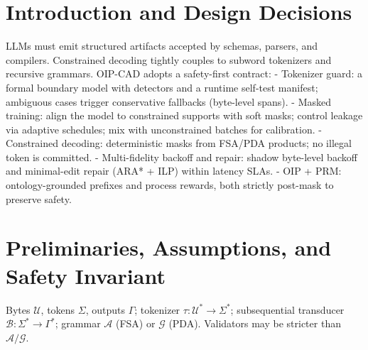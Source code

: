 \documentclass{article}
\begin{document}
\begin{figure}[H]
\centering
{}
\end{figure}

\section{Introduction and Design Decisions}
LLMs must emit structured artifacts accepted by schemas, parsers, and compilers. Constrained decoding tightly couples to subword tokenizers and recursive grammars. OIP-CAD adopts a safety-first contract:
- Tokenizer guard: a formal boundary model with detectors and a runtime self-test manifest; ambiguous cases trigger conservative fallbacks (byte-level spans).
- Masked training: align the model to constrained supports with soft masks; control leakage via adaptive schedules; mix with unconstrained batches for calibration.
- Constrained decoding: deterministic masks from FSA/PDA products; no illegal token is committed.
- Multi-fidelity backoff and repair: shadow byte-level backoff and minimal-edit repair (ARA* + ILP) within latency SLAs.
- OIP + PRM: ontology-grounded prefixes and process rewards, both strictly post-mask to preserve safety.

\section{Preliminaries, Assumptions, and Safety Invariant}
Bytes $\mathcal{U}$, tokens $\Sigma$, outputs $\Gamma$; tokenizer $\tau:\mathcal{U}^\ast\to\Sigma^\ast$; subsequential transducer $\mathcal{B}:\Sigma^\ast\to\Gamma^\ast$; grammar $\mathcal{A}$ (FSA) or $\mathcal{G}$ (PDA). Validators may be stricter than $\mathcal{A}/\mathcal{G}$.
\end{document}
